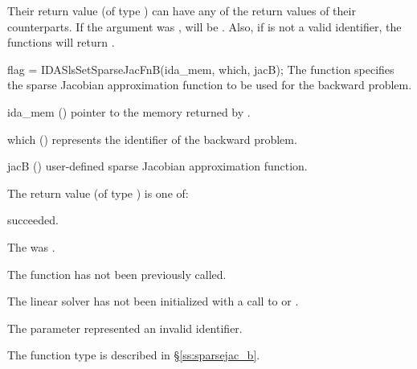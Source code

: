 Their return value  (of type ) can have any of the return values of their counterparts.
If the  argument was , 
 will be . 
Also, if  is not a valid identifier, the functions will return 
.


{
  flag = IDASlsSetSparseJacFnB(ida\_mem, which, jacB);
}
{
  The function  specifies the sparse Jacobian
  approximation function to be used for the backward problem.
}
{
  \begin{args}
  \item[ida\_mem] ()
    pointer to the {\idas} memory returned by .
  \item[which] ()
    represents the identifier of the backward problem.
  \item[jacB] ()
    user-defined sparse Jacobian approximation function.
  \end{args}
}
{
  The return value  (of type ) is one of:
  \begin{args}
  \item[\Id{IDASLS\_SUCCESS}] 
     succeeded.
  \item[\Id{IDASLS\_MEM\_NULL}]
    The  was .
  \item[\Id{IDASLS\_NO\_ADJ}]
    The function  has not been previously called.
  \item[\Id{IDASLS\_LMEM\_NULL}]
    The linear solver has not been initialized with a call to 
    or .
  \item[\Id{IDASLS\_ILL\_INPUT}]
    The parameter  represented an invalid identifier.
  \end{args}
}
{
  The function type  is described in \S\ref{ss:sparsejac_b}.
}


